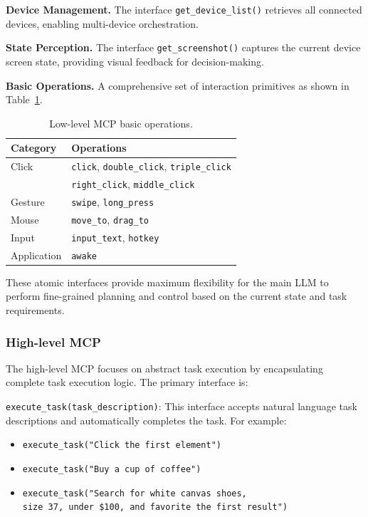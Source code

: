 \noindent\textbf{Device Management.} The interface \texttt{get\_device\_list()} retrieves all connected devices, enabling multi-device orchestration.

\noindent\textbf{State Perception.} The interface \texttt{get\_screenshot()} captures the current device screen state, providing visual feedback for decision-making.

\noindent\textbf{Basic Operations.} A comprehensive set of interaction primitives as shown in Table~\ref{tab:low-level-mcp}.

\begin{table}[h]
\centering
\small
\begin{tabular}{ll}
\hline
\textbf{Category} & \textbf{Operations} \\
\hline
Click & \texttt{click}, \texttt{double\_click}, \texttt{triple\_click} \\
      & \texttt{right\_click}, \texttt{middle\_click} \\
\hline
Gesture & \texttt{swipe}, \texttt{long\_press} \\
\hline
Mouse & \texttt{move\_to}, \texttt{drag\_to} \\
\hline
Input & \texttt{input\_text}, \texttt{hotkey} \\
\hline
Application & \texttt{awake} \\
\hline
\end{tabular}
\caption{Low-level MCP basic operations.}
\label{tab:low-level-mcp}
\end{table}

These atomic interfaces provide maximum flexibility for the main LLM to perform fine-grained planning and control based on the current state and task requirements.

\subsubsection{High-level MCP}
The high-level MCP focuses on abstract task execution by encapsulating complete task execution logic. The primary interface is:

\noindent\texttt{execute\_task(task\_description)}: This interface accepts natural language task descriptions and automatically completes the task. For example:
\begin{itemize}
    \item \texttt{execute\_task("Click the first element")}
    \item \texttt{execute\_task("Buy a cup of coffee")}
    \item {\small\texttt{execute\_task("Search for white canvas shoes,\\size 37, under \$100, and favorite the first result")}}
\end{itemize}

